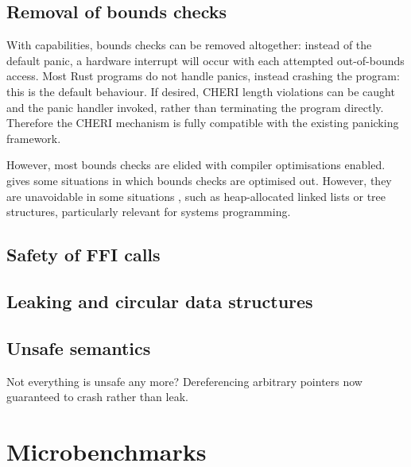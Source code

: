 \documentclass[dissertation.tex]{subfiles}
\begin{document}
\subsection{Removal of bounds checks}
\label{sec:eval-rust-bounds}

With capabilities, bounds checks can be removed altogether: instead of
the default panic, a hardware interrupt will occur with each attempted
out-of-bounds access.
Most Rust programs do not handle panics, instead crashing the program:
this is the default behaviour.
If desired, CHERI length violations can be caught and the panic handler
invoked, rather than terminating the program directly.
Therefore the CHERI mechanism is fully compatible with the existing
panicking framework.

However, most bounds checks are elided with compiler optimisations
enabled.
 gives some situations in which bounds checks are
optimised out.
However, they are unavoidable in some situations , such as
heap-allocated linked lists or tree structures, particularly relevant
for systems programming.



\subsection{Safety of FFI calls}


\subsection{Leaking and circular data structures}


\subsection{Unsafe semantics}
Not everything is unsafe any more? Dereferencing arbitrary pointers now
guaranteed to crash rather than leak.


\section{Microbenchmarks}
\label{sec:eval-micro}

\end{document}
